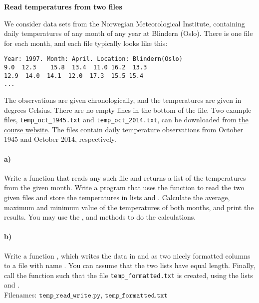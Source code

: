 \begin{Problem}{\textbf{Read temperatures from two files}}

\noindent
We consider data sets from the Norwegian Meteorological Institute, containing
daily temperatures of any month of any year at Blindern (Oslo). There is one file for each month,
and each file typically looks like this:
\begin{lstlisting}
Year: 1997. Month: April. Location: Blindern(Oslo)
9.0  12.3    15.8  13.4  11.0 16.2  13.3
12.9  14.0  14.1  12.0  17.3  15.5 15.4
...
\end{lstlisting}
The observations are given chronologically, and the temperatures are given in degrees Celsius.
There are no empty lines in the bottom of the file. Two example files,
\texttt{temp\_oct\_1945.txt} and \texttt{temp\_oct\_2014.txt}, can be downloaded from
\href{\dataurl}{the course website}. The files contain daily temperature observations
from October 1945 and October 2014, respectively.
\paragraph{a)}
Write a function  that reads any such file and returns a list of the
temperatures from the given month. Write a program that uses the function to read the
two given files and store the temperatures in lists  and
. Calculate the average, maximum and minimum value of the temperatures
of both months, and print the results. You may use
the ,  and  methods to
do the calculations.
\paragraph{b)}
Write a function , which writes the data in
 and  as two nicely formatted columns to a file with name
. You can assume that the two lists have equal length.
Finally, call the function such that the file \texttt{temp\_formatted.txt} is created,
using the lists  and .
\\
Filenames: $\texttt{temp\_read\_write.py}$, $\texttt{temp\_formatted.txt}$

\end{Problem}


